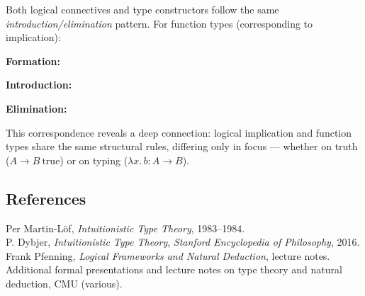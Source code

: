\begin{example}
Both logical connectives and type constructors follow the same
\textit{introduction/elimination} pattern.
For function types (corresponding to implication):

\textbf{Formation:}
\begin{prooftree}
\end{prooftree}

\textbf{Introduction:}
\begin{prooftree}
\end{prooftree}

\textbf{Elimination:}
\begin{prooftree}
\end{prooftree}

This correspondence reveals a deep connection:
logical implication and function types share the same structural rules,
differing only in focus — whether on truth (\(A \rightarrow B\ \text{true}\))
or on typing (\(\lambda x.\,b : A \rightarrow B\)).
\end{example}

\subsection*{References}
Per Martin-Löf, \textit{Intuitionistic Type Theory}, 1983–1984. \\
P. Dybjer, \textit{Intuitionistic Type Theory}, \textit{Stanford Encyclopedia of Philosophy}, 2016. \\
Frank Pfenning, \textit{Logical Frameworks and Natural Deduction}, lecture notes. \\
Additional formal presentations and lecture notes on type theory and natural deduction, CMU (various).



